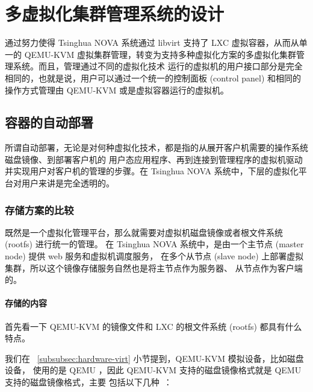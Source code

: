 \chapter{多虚拟化集群管理系统的设计}
\label{cha:multi-hypervisor-management-system}

通过努力使得 Tsinghua NOVA 系统通过 libvirt 支持了 LXC 虚拟容器，从而从单一的 QEMU-KVM
虚拟集群管理，转变为支持多种虚拟化方案的多虚拟化集群管理系统。而且，管理通过不同的虚拟化技术
运行的虚拟机的用户接口部分是完全相同的，也就是说，用户可以通过一个统一的控制面板 (control
panel) 和相同的操作方式管理由 QEMU-KVM 或是虚拟容器运行的虚拟机。

\section{容器的自动部署}
\label{sec:auto-deployment}

所谓自动部署，无论是对何种虚拟化技术，都是指的从展开客户机需要的操作系统磁盘镜像、到部署客户机的
用户态应用程序、再到连接到管理程序的虚拟机驱动并实现用户对客户机的管理的步骤。在 Tsinghua NOVA
系统中，下层的虚拟化平台对用户来讲是完全透明的。

\subsection{存储方案的比较}
\label{subsec:comparison-network-storage}

既然是一个虚拟化管理平台，那么就需要对虚拟机磁盘镜像或者根文件系统 (rootfs) 进行统一的管理。
在 Tsinghua NOVA 系统中，是由一个主节点 (master node) 提供 web 服务和虚拟机调度服务，
在多个从节点 (slave node) 上部署虚拟集群，所以这个镜像存储服务自然也是将主节点作为服务器、
从节点作为客户端的。

\subsubsection{存储的内容}

首先看一下 QEMU-KVM 的镜像文件和 LXC 的根文件系统 (rootfs) 都具有什么特点。


我们在 ~\ref{subsubsec:hardware-virt} 小节提到，QEMU-KVM 模拟设备，比如磁盘设备，
使用的是 QEMU ，因此 QEMU-KVM 支持的磁盘镜像格式就是 QEMU 支持的磁盘镜像格式，主要
包括以下几种~\cite{docker-in-practice}：

